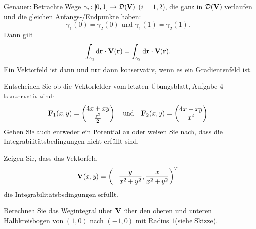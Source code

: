 \documentclass{scrartcl}
\newcommand{\DD}{\mathcal{D}}
\begin{document}
Genauer: Betrachte Wege $\gamma_i\colon [0,1] \to \DD(\mat V)$ ($i=1,2$), die ganz in $\DD(\mat V)$ verlaufen und die gleichen Anfangs-/Endpunkte haben: 
\[
  \gamma_1(0) = \gamma_2(0) \mbox{ und } \gamma_1(1) = \gamma_2(1).
\]
Dann gilt
\[
  \int_{\gamma_1}  \mathrm{d} \mathbf{r} \cdot  \mathbf{V}(\mathbf{r}) = \int_{\gamma_2} \mathrm{d} \mathbf{r} \cdot \mathbf{V}(\mathbf{r}).
\]
Ein Vektorfeld ist dann und nur dann konservativ, wenn es ein Gradientenfeld ist. 
\begin{subex}
  \item{} Entscheiden Sie ob die Vektorfelder vom letzten Übungsblatt, Aufgabe 4 konservativ sind:
  \[
    \mathbf{F}_1(x, y) = \begin{pmatrix}4x + xy \\ \frac{x^2}{2}\end{pmatrix} \quad \mbox{und} \quad \mathbf{F}_2 (x, y) = \begin{pmatrix}4x + xy \\ x^2\end{pmatrix}
  \]
  Geben Sie auch entweder ein Potential an oder weisen Sie nach, dass die Integrabilitätsbedingungen nicht erfüllt sind.
  \item{} Zeigen Sie, dass das Vektorfeld
  \[
    \mathbf{V}(x,y) = \left(- \frac{y}{x^2 + y^2}, \frac{x}{x^2 + y^2} \right)^T
  \]
  die Integrabilitätsbedingungen erfüllt.
  \item{} Berechnen Sie das Wegintegral über $\mathbf{V}$ über den oberen und unteren Halbkreisbogen von $(1,0)$ nach $(-1,0)$ mit Radius $1$(siehe Skizze).
\end{subex}
\begin{center}
\end{center}
\end{document}

